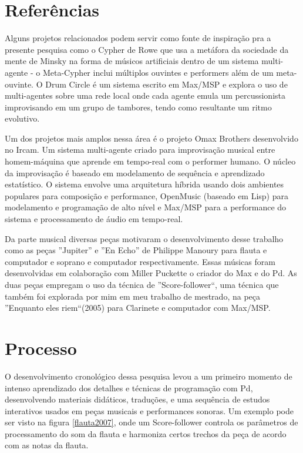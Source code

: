 \documentclass[draft]{ppgmus}
\begin{document}
\section{Referências}

Alguns projetos relacionados podem servir como fonte de inspiração pra
a presente pesquisa como o Cypher \cite{rowe93:interactive}   de Rowe que usa a metáfora da
sociedade da mente de Minsky na forma de músicos artificiais dentro de
um sistema multi-agente - o Meta-Cypher inclui múltiplos ouvintes e
performers além de um meta-ouvinte.  O Drum Circle \cite{eigenfeld07:drum} é um sistema escrito em Max/MSP e explora o uso de
multi-agentes sobre uma rede local onde cada agente emula um
percussionista improvisando em um grupo de tambores, tendo como
resultante um ritmo evolutivo.

Um dos projetos mais amplos nessa área é o projeto Omax Brothers \cite{assayag06:omax}
desenvolvido no Ircam. Um sistema multi-agente criado para
improvisação musical entre homem-máquina que aprende em tempo-real com
o performer humano. O núcleo da improvisação é baseado em modelamento
de sequência e aprendizado estatístico. O sistema envolve uma
arquitetura híbrida usando dois ambientes populares para composição e
performance, OpenMusic (baseado em Lisp) para modelamento e
programação de alto nível e Max/MSP para a performance do sistema e
processamento de áudio em tempo-real.

Da parte musical diversas peças motivaram o desenvolvimento desse trabalho como as peças
''Jupiter'' e ''En Echo'' de Philippe Manoury para flauta e computador e soprano e computador respectivamente.
Essas músicas foram desenvolvidas em colaboração com Miller Puckette o criador do Max e do Pd. As duas 
peças empregam o uso da técnica de ''Score-follower``, uma técnica que também foi explorada por mim em
meu trabalho de mestrado, na peça ''Enquanto eles riem``(2005) para Clarinete e computador com Max/MSP.

\section{Processo}

O desenvolvimento cronológico dessa pesquisa levou a um primeiro momento de intenso aprendizado
dos detalhes e técnicas de programação com Pd, desenvolvendo materiais didáticos, traduções, e uma
sequência de estudos interativos usados em peças musicais e performances sonoras. Um exemplo pode ser visto
na figura \ref{flauta2007}, onde um Score-follower controla os parâmetros de 
processamento do som da flauta e harmoniza certos trechos da peça de acordo com as notas da flauta.
\end{document}
